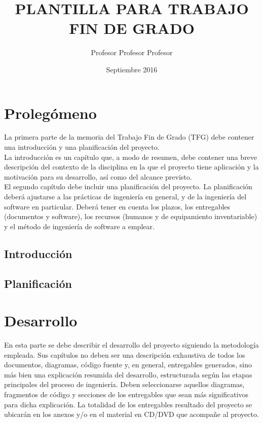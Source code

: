 \documentclass[a4paper,11pt,twoside]{book}
\title{PLANTILLA PARA TRABAJO FIN DE GRADO}
\author{Profesor Profesor Profesor}
\date{Septiembre 2016}
\begin{document}
\pagestyle{empty}


\cleardoublepage


\cleardoublepage


\newpage


\newpage


\frontmatter

\pagestyle{plain}

\tableofcontents
\listoffigures
\listoftables

\mainmatter



\part{Prolegómeno}
\null\vfill
\noindent La primera parte de la memoria del Trabajo Fin de Grado (TFG) debe contener una introducción y una planificación del proyecto.\\

La introducción es un capítulo que, a modo de resumen, debe contener una breve descripción del contexto de la disciplina en la que el proyecto tiene aplicación y la motivación para su desarrollo, así como del alcance previsto.\\

El segundo capítulo debe incluir una planificación del proyecto. La planificación deberá ajustarse a las prácticas de ingeniería en general, y de la ingeniería del software en particular. Deberá tener en cuenta los plazos, los entregables (documentos y software), los recursos (humanos y de equipamiento inventariable) y el método de ingeniería de software a emplear.
\\

\chapter{Introducción}


\chapter{Planificación}


\part{Desarrollo}
\null\vfill
\noindent En esta parte se debe describir el desarrollo del proyecto siguiendo la metodología empleada. Sus capítulos no deben ser una descripción exhaustiva de todos los documentos, diagramas, código fuente y, en general, entregables generados, sino más bien una explicación resumida del desarrollo, estructurada según las etapas principales del proceso de ingeniería. Deben seleccionarse aquellos diagramas, fragmentos de código y secciones de los entregables que sean más significativos para dicha explicación. La totalidad de los entregables resultado del proyecto se ubicarán en los anexos y/o en el material en CD/DVD que acompañe al proyecto.
\end{document}
